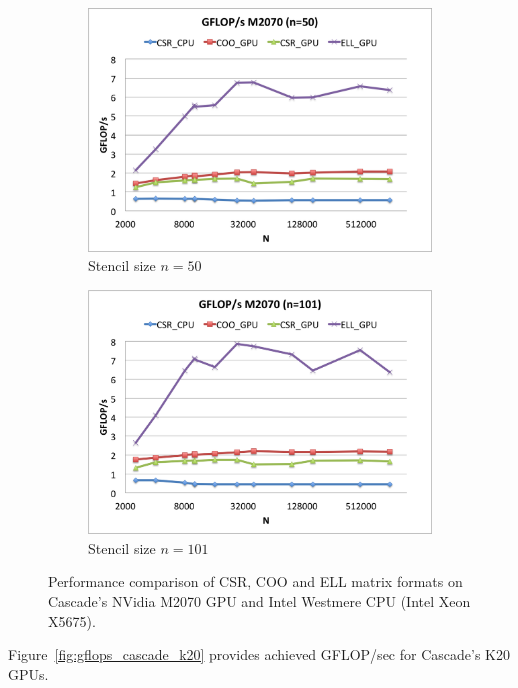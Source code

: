 \documentclass{report}
\begin{document}
\begin{figure}
\begin{subfigure}[t]{0.48\textwidth}
\includegraphics[width=\textwidth]{gpu_content/cascade_spmv/gflops_cascade_m2070_n50.png}
\caption{Stencil size $n=50$}
\end{subfigure}
\quad
\begin{subfigure}[t]{0.48\textwidth}
\centering
\includegraphics[width=\textwidth]{gpu_content/cascade_spmv/gflops_cascade_m2070_n101.png}
\caption{Stencil size $n=101$}
\end{subfigure}
\caption{Performance comparison of CSR, COO and ELL matrix formats on Cascade's NVidia M2070 GPU and Intel Westmere CPU (Intel Xeon X5675).}
\label{fig:gflops_cascade_m2070}
\end{figure}

Figure~\ref{fig:gflops_cascade_k20} provides achieved GFLOP/sec for Cascade's K20 GPUs.  
\end{document}
